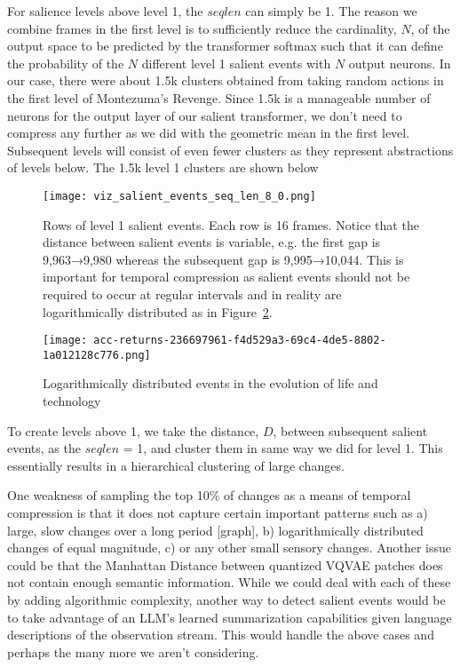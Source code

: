 \documentclass{article}
\begin{document}
For salience levels above level 1, the $seqlen$ can simply be 1. The reason we combine frames in the first level is to sufficiently reduce the cardinality, $N$, of the output space to be predicted by the transformer softmax such that it can define the probability of the $N$ different level 1 salient events with $N$ output neurons. In our case, there were about 1.5k clusters obtained from taking random actions in the first level of Montezuma's Revenge. Since 1.5k is a manageable number of neurons for the output layer of our salient transformer, we don't need to compress any further as we did with the geometric mean in the first level. Subsequent levels will consist of even fewer clusters as they represent abstractions of levels below. The 1.5k level 1 clusters are shown below
\begin{figure}
    \centering
    \texttt{[image: viz\_salient\_events\_seq\_len\_8\_0.png]}
    \caption{Rows of level 1 salient events. Each row is 16 frames. Notice that the distance between salient events is variable, e.g. the first gap is 9,963→9,980 whereas the subsequent gap is 9,995→10,044. This is important for temporal compression as salient events should not be required to occur at regular intervals and in reality \cite{kurzweil1999age} are logarithmically distributed as in Figure~\ref{fig:acc-returns}.
    }
    \label{fig:level-1-salient}
\end{figure}

\begin{figure}
    \centering
    \texttt{[image: acc-returns-236697961-f4d529a3-69c4-4de5-8802-1a012128c776.png]}
    \caption{ Logarithmically distributed events in the evolution of life and technology \cite{kurzweil1999age}}
    \label{fig:acc-returns}
\end{figure}

To create levels above 1, we take the distance, $D$, between subsequent salient events, as the $seqlen$ = 1, and cluster them in same way we did for level 1. This essentially results in a hierarchical clustering of large changes.

One weakness of sampling the top 10\% of changes as a means of temporal compression is that it does not capture certain important patterns such as a) large, slow changes over a long period [graph], b) logarithmically distributed changes of equal magnitude, c) or any other small sensory changes. Another issue could be that the Manhattan Distance between quantized VQVAE patches does not contain enough semantic information. While we could deal with each of these by adding algorithmic complexity, another way to detect salient events would be to take advantage of an LLM's learned summarization capabilities given language descriptions of the observation stream. This would handle the above cases and perhaps the many more we aren't considering.
\end{document}
